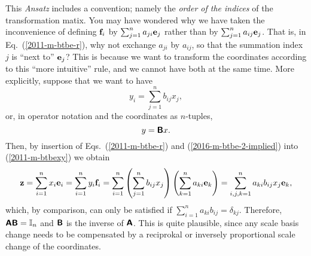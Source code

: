 This {\it Ansatz} includes a convention; namely the {\em order of the indices} of the transformation matix.
You may have wondered why we have taken the inconvenience of defining
${\bf f}_i$ by $\sum_{j=1}^n a_{ji} {\bf e}_j$ rather than by $\sum_{j=1}^n a_{ij} {\bf e}_j$.
That is, in  Eq.~(\ref{2011-m-btbe-r}), why not exchange $a_{ji}$ by $a_{ij}$,
so that the summation index $j$ is ``next to'' ${\bf e}_j$?
This is because we want to transform the coordinates according to this ``more intuitive'' rule, and we cannot have both
at the same time.
More explicitly, suppose that we want to have
\begin{equation}
y_i =\sum_{j=1}^n b_{ij} x_j
,
\label{2016-m-btbe-2-implied}
\end{equation}
or, in operator notation and the coordinates as $n$-tuples,
\begin{equation}
y = \textsf{\textbf{B}} x
.
\label{2016-m-btbe-2-impliedm}
\end{equation}
Then, by insertion of  Eqs.~(\ref{2011-m-btbe-r}) and (\ref{2016-m-btbe-2-implied}) into (\ref{2011-m-btbexy})
we obtain
\begin{equation}
{\bf z}=
\sum_{i=1}^n x_i{\bf e}_i
=
\sum_{i=1}^n  y_i{\bf f}_i
= \sum_{i=1}^n \left( \sum_{j=1}^n b_{ij} x_j \right)   \left( \sum_{k=1}^n a_{ki} {\bf e}_k \right)
= \sum_{i,j,k=1}^n  a_{ki} b_{ij}  x_j {\bf e}_k
,
\label{2016-m-btbexy}
\end{equation}
which, by comparison, can only be satisfied if  $\sum_{i=1}^n  a_{ki} b_{ij} = \delta_{kj}$.
Therefore, $\textsf{\textbf{A}}\textsf{\textbf{B}} = {\Bbb I}_n$ and
$\textsf{\textbf{B}}$   is the inverse of
$\textsf{\textbf{A}}$.
This is quite plausible, since any scale basis change needs to be compensated by a reciprokal or inversely proportional
scale change of the coordinates.




